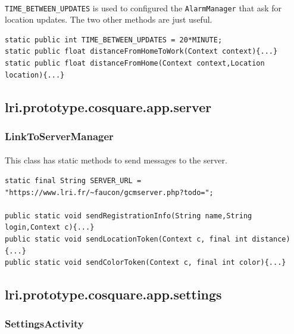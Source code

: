 \documentclass[12pt]{article}
\begin{document}
\paragraph{}\verb?TIME_BETWEEN_UPDATES? is used to configured the \verb?AlarmManager? that ask for location updates. The two other methods are just useful. 

\begin{verbatim}
static public int TIME_BETWEEN_UPDATES = 20*MINUTE;
static public float distanceFromHomeToWork(Context context){...}
static public float distanceFromHome(Context context,Location location){...}
\end{verbatim}

\subsection{lri.prototype.cosquare.app.server}
\subsubsection{LinkToServerManager}
\paragraph{}This class has static methods to send messages to the server. 

\begin{verbatim}
static final String SERVER_URL = "https://www.lri.fr/~faucon/gcmserver.php?todo=";

public static void sendRegistrationInfo(String name,String login,Context c){...}
public static void sendLocationToken(Context c, final int distance){...}
public static void sendColorToken(Context c, final int color){...}
\end{verbatim}




\subsection{lri.prototype.cosquare.app.settings}
\subsubsection{SettingsActivity}
\end{document}
